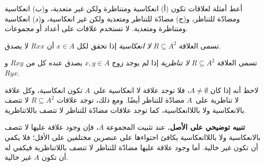 \documentclass[../../../include/open-logic-section]{subfiles}
\begin{document}
\begin{prob}
أعط أمثلة لعلاقات تكون (أ) انعكاسية ومتناظرة ولكن غير متعدية، و(ب)
انعكاسية ومضادّة للتناظر، و(ج) مضادّة للتناظر ومتعدية ولكن غير انعكاسية،
و(د) انعكاسية ومتناظرة ومتعدية. لا تستخدم علاقات على أعداد أو مجموعات.
\end{prob}

\begin{defn}[اللاانعكاسية]
تسمى العلاقة $R \subseteq A^2$ \emph{لا انعكاسية} إذا تحقق لكل $x \in
A$ أن $Rxx$ لا يصدق.
\end{defn}

\begin{defn}[اللاتناظرية]
تسمى العلاقة $R \subseteq A^2$ \emph{لا تناظرية} إذا لم يوجد زوج $x,y\in
A$ يصدق عنده كل من $Rxy$ و~$Ryx$.
\end{defn}

لاحظ أنه إذا كان $A \neq \emptyset$، فلا توجد علاقة لا انعكاسية على~$A$
تكون انعكاسية، وكل علاقة لا تناظرية على~$A$ مضادّة للتناظر أيضًا. ومع ذلك،
توجد علاقات $R \subseteq A^2$ لا تتصف بالانعكاسية ولا باللاانعكاسية، كما
توجد علاقات مضادّة للتناظر لا تتصف باللاتناظرية.

\textbf{تنبيه توضيحي على الأصل.} عند تثبيت المجموعة $A$، فإن وجود علاقة
عليها لا تتصف بالانعكاسية ولا باللاانعكاسية يكافئ احتواءها على عنصرين
مختلفين على الأقل؛ فلا يكفي أن تكون غير خالية. أما وجود علاقة عليها
مضادّة للتناظر لا تتصف باللاتناظرية فيكفي له أن تكون $A$ غير خالية.
\end{document}
